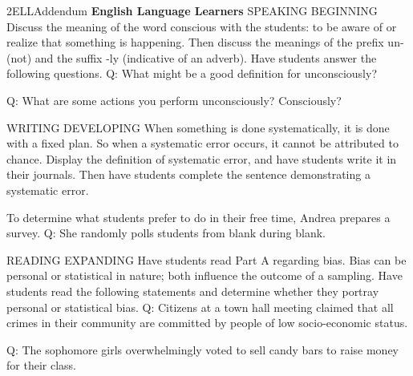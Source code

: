 \documentclass{article}
\newenvironment{te-addendum}[2]{}{}     %
\newcommand{\answer}[1]{}               %
\begin{document}
\begin{te-addendum}{2}{ELLAddendum}
\textbf{English Language Learners}
SPEAKING BEGINNING Discuss the meaning of the word conscious with the students: to be aware of or realize that something is happening. Then discuss the meanings of the prefix un- (not) and the suffix -ly (indicative of an adverb). Have students answer the following questions.
Q: What might be a good definition for unconsciously?
\answer{not aware of something}
Q: What are some actions you perform unconsciously? Consciously?
\answer{breathing, blinking; eating, riding a bike}
WRITING DEVELOPING When something is done systematically, it is done with a fixed plan. So when a systematic error occurs, it cannot be attributed to chance. Display the definition of systematic error, and have students write it in their journals. Then have students complete the sentence demonstrating a systematic error.
\item To determine what students prefer to do in their free time, Andrea prepares a survey.
Q: She randomly polls students from blank during blank.
\answer{Sample: 12th grade, the basketball game}
READING EXPANDING Have students read Part A regarding bias. Bias can be personal or statistical in nature; both influence the outcome of a sampling. Have students read the following statements and determine whether they portray personal or statistical bias.
Q: Citizens at a town hall meeting claimed that all crimes in their community are committed by people of low socio-economic status.
\answer{personal}
Q: The sophomore girls overwhelmingly voted to sell candy bars to raise money for their class.
\answer{statistical}
\end{te-addendum}
\end{document}
